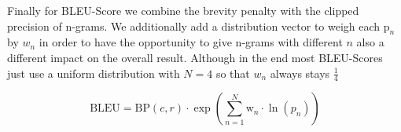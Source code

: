 Finally for BLEU-Score we combine the brevity penalty with the clipped precision of n-grams. We additionally add a distribution vector to weigh each $ \text{p}_n$ by $w_n$ in order to have the opportunity to give n-grams with different $n$ also a different impact on the overall result. Although in the end most BLEU-Scores just use a uniform distribution with $N = 4$ so that $w_n$ always stays $\frac{1}{4}$

\[\text{BLEU} = \text{BP}(c, r) \cdot \exp\left(\sum_{n=1}^{N}  \text{w}_n \cdot \ln(p_n)\right)\]

